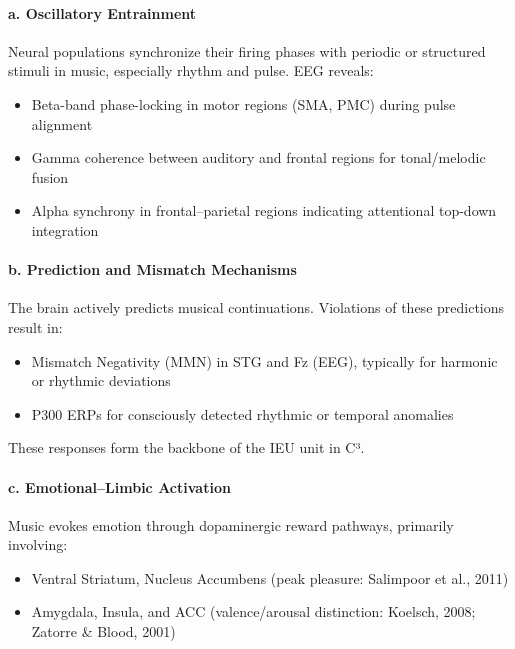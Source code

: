 \documentclass[10pt]{article}
\begin{document}
\paragraph{a. Oscillatory Entrainment}

Neural populations synchronize their firing phases with periodic or structured stimuli in music, especially rhythm and pulse. EEG reveals:

\begin{itemize}
    \item Beta-band phase-locking in motor regions (SMA, PMC) during pulse alignment
    \item Gamma coherence between auditory and frontal regions for tonal/melodic fusion
    \item Alpha synchrony in frontal–parietal regions indicating attentional top-down integration
\end{itemize}

\paragraph{b. Prediction and Mismatch Mechanisms}

The brain actively predicts musical continuations. Violations of these predictions result in:

\begin{itemize}
    \item Mismatch Negativity (MMN) in STG and Fz (EEG), typically for harmonic or rhythmic deviations
    \item P300 ERPs for consciously detected rhythmic or temporal anomalies
\end{itemize}

These responses form the backbone of the IEU unit in C³.

\paragraph{c. Emotional–Limbic Activation}

Music evokes emotion through dopaminergic reward pathways, primarily involving:

\begin{itemize}
    \item Ventral Striatum, Nucleus Accumbens (peak pleasure: Salimpoor et al., 2011)
    \item Amygdala, Insula, and ACC (valence/arousal distinction: Koelsch, 2008; Zatorre \& Blood, 2001)
\end{itemize}
\end{document}
